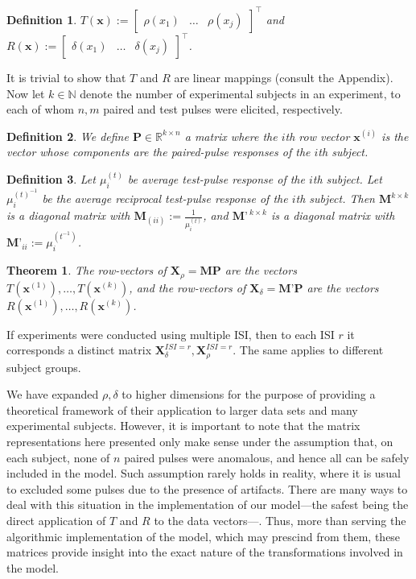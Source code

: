 \documentclass{article}
\newtheorem{definition}{Definition}
\newtheorem{theorem}{Theorem}
\begin{document}
\begin{multicols}{2}
\begin{definition}
    $T(\textbf{x}) := \begin{bmatrix} 
        \rho(x_1) & \ldots & \rho(x_j)
    \end{bmatrix}^\intercal $ and $R(\textbf{x}) := \begin{bmatrix} 
        \delta(x_1) & \ldots & \delta(x_j) 
    \end{bmatrix}^\intercal $.
\end{definition}

It is trivial to show that $T$ and $R$ are linear mappings (consult the
Appendix). Now let $k \in \mathbb{N}$ denote the number of experimental subjects
in an experiment, to each of whom $n, m$ paired and test pulses were elicited,
respectively.

\begin{definition}
    We define $\textbf{P} \in \mathbb{R}^{k \times n}$ a
    matrix where the $i$th row vector $\textbf{x}^{(i)}$ is the vector whose
    components are the paired-pulse responses of the $i$th subject.
\end{definition}

\begin{definition}
    Let $\mu^{(t)}_i$ be average test-pulse response of the $i$th subject. Let
    $\mu^{(t)^{-1}}_i$ be the average \textit{reciprocal} test-pulse response of
    the $i$th subject. Then $\textbf{M}^{k \times k}$ is a diagonal matrix with
    $\textbf{M}_{(ii)} := \frac{1}{\mu^{(t)}_{i}}$, and $\textbf{M'}^{~ k \times
    k}$ is a diagonal matrix with $\textbf{M'}_{ii} := \mu^{(t^{-1})}_i$.
\end{definition}

\begin{theorem}
    The row-vectors of $\textbf{X}_\rho = \textbf{M}\textbf{P}$ are the
    vectors $T(\textbf{x}^{(1)}), \ldots, T(\textbf{x}^{(k)})$, and
    the row-vectors of $\textbf{X}_\delta = \textbf{M'}\textbf{P}$ 
    are the vectors $R(\textbf{x}^{(1)}), \ldots,
    R(\textbf{x}^{(k)})$.
\end{theorem}


If experiments were conducted using multiple ISI, then to each ISI $r$ it
corresponds a distinct matrix $\textbf{X}_\delta^{ISI = r},
\textbf{X}_\rho^{ISI = r}$. The same applies to different subject groups.

We have expanded $\rho, \delta$ to higher dimensions for the purpose of
providing a theoretical framework of their application to larger data sets and
many experimental subjects. However, it is important to note that the matrix
representations here presented only make sense under the assumption that, on
each subject, none of $n$ paired pulses were anomalous, and hence all can be
safely included in the model. Such assumption rarely holds in reality, where it
is usual to excluded some pulses due to the presence of artifacts. There are
many ways to deal with this situation in the implementation of our model---the
safest being the direct application of $T$ and $R$ to the data vectors---. Thus,
more than serving the algorithmic implementation of the model, which may
prescind from them, these matrices provide insight into the exact nature of the
transformations involved in the model.



\end{multicols}
\end{document}

